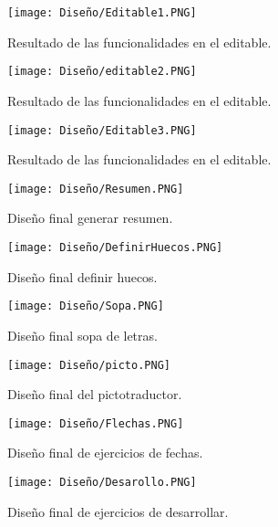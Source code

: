 \begin{figure}[ht!]
  \centering
  \texttt{[image: Diseño/Editable1.PNG]}
  \caption{Resultado de las funcionalidades en el editable.}
  \label{editable1}
\end{figure}


\begin{figure}[ht!]
  \centering
  \texttt{[image: Diseño/editable2.PNG]}
  \caption{Resultado de las funcionalidades en el editable.}
  \label{editable2}
\end{figure}

\begin{figure}[ht!]
  \centering
  \texttt{[image: Diseño/Editable3.PNG]}
  \caption{Resultado de las funcionalidades en el editable.}
  \label{editable3}
\end{figure}



\begin{figure}[ht!]
  \centering
  \texttt{[image: Diseño/Resumen.PNG]}
  \caption{Diseño final generar resumen.}
  \label{resuemn}
\end{figure}

\begin{figure}[ht!]
  \centering
  \texttt{[image: Diseño/DefinirHuecos.PNG]}
  \caption{Diseño final definir huecos.}
  \label{definir_hueco}
\end{figure}

\begin{figure}[ht!]
  \centering
  \texttt{[image: Diseño/Sopa.PNG]}
  \caption{Diseño final sopa de letras.}
  \label{sopaLetras}
\end{figure}

\begin{figure}[ht!]
  \centering
  \texttt{[image: Diseño/picto.PNG]}
  \caption{Diseño final del pictotraductor.}
  \label{pictotraductor}
\end{figure}

\begin{figure}[ht!]
  \centering
  \texttt{[image: Diseño/Flechas.PNG]}
  \caption{Diseño final de ejercicios de fechas.}
  \label{flechas}
\end{figure}

\begin{figure}[ht!]
  \centering
  \texttt{[image: Diseño/Desarollo.PNG]}
  \caption{Diseño final de ejercicios de desarrollar.}
  \label{Desarrollo}
\end{figure}

